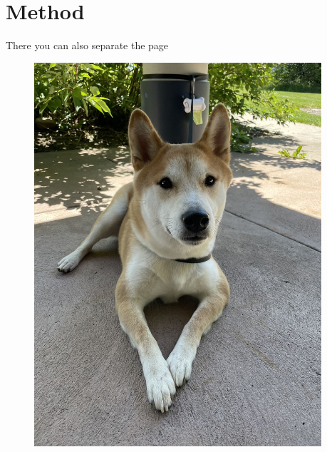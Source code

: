 \documentclass[10pt, xcolor=x11names,compress]{beamer}
\begin{document}
\section{Method}
\begin{frame}[label=Rocky]{There you can also separate the page}
\begin{figure}
 \begin{columns}[c]
  \begin{column}{0.3\textwidth}
    \centering
    \includegraphics[width=1\textwidth]{Figure2.jpg}
  \end{column}
  \begin{column}{0.3\textwidth}
    \centering

\end{column}
\end{columns}
\end{figure}
\end{frame}
\end{document}

